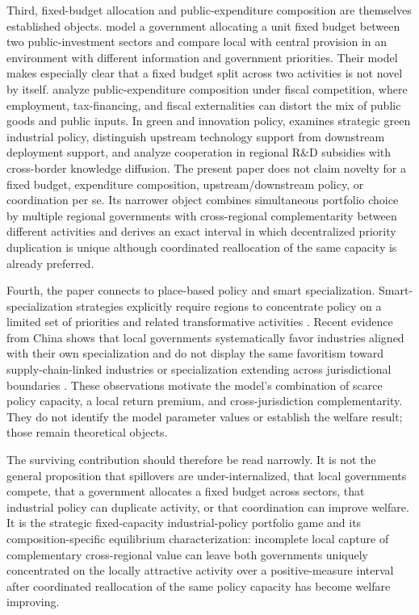 Third, fixed-budget allocation and public-expenditure composition are themselves established objects. \citet{KosecMogues2020} model a government allocating a unit fixed budget between two public-investment sectors and compare local with central provision in an environment with different information and government priorities. Their model makes especially clear that a fixed budget split across two activities is not novel by itself. \citet{KikuchiKuzawaTamai2026} analyze public-expenditure composition under fiscal competition, where employment, tax-financing, and fiscal externalities can distort the mix of public goods and public inputs. In green and innovation policy, \citet{Fischer2017} examines strategic green industrial policy, \citet{FischerGreakerRosendahl2018} distinguish upstream technology support from downstream deployment support, and \citet{BorotaMilicevicEtAl2026} analyze cooperation in regional R\&D subsidies with cross-border knowledge diffusion. The present paper does not claim novelty for a fixed budget, expenditure composition, upstream/downstream policy, or coordination per se. Its narrower object combines simultaneous portfolio choice by multiple regional governments with cross-regional complementarity between different activities and derives an exact interval in which decentralized priority duplication is unique although coordinated reallocation of the same capacity is already preferred.

Fourth, the paper connects to place-based policy and smart specialization. Smart-specialization strategies explicitly require regions to concentrate policy on a limited set of priorities and related transformative activities \citep{ForayEichlerKeller2021}. Recent evidence from China shows that local governments systematically favor industries aligned with their own specialization and do not display the same favoritism toward supply-chain-linked industries or specialization extending across jurisdictional boundaries \citep{TianWangZhang2027}. These observations motivate the model's combination of scarce policy capacity, a local return premium, and cross-jurisdiction complementarity. They do not identify the model parameter values or establish the welfare result; those remain theoretical objects.

The surviving contribution should therefore be read narrowly. It is not the general proposition that spillovers are under-internalized, that local governments compete, that a government allocates a fixed budget across sectors, that industrial policy can duplicate activity, or that coordination can improve welfare. It is the strategic fixed-capacity industrial-policy portfolio game and its composition-specific equilibrium characterization: incomplete local capture of complementary cross-regional value can leave both governments uniquely concentrated on the locally attractive activity over a positive-measure interval after coordinated reallocation of the same policy capacity has become welfare improving.
